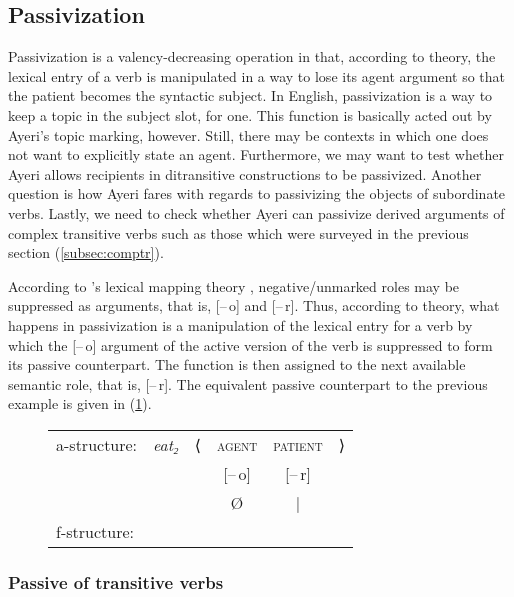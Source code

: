 \subsection{Passivization}
\label{subsubsec:valdecr}

Passivization is a valency-decreasing operation in that, according to \Lfg{}
theory, the lexical entry of a verb is manipulated in a way to lose its agent
argument so that the patient becomes the syntactic subject. In English,
passivization is a way to keep a topic in the subject slot, for one. This
function is basically acted out by Ayeri's topic marking, however. Still, there
may be contexts in which one does not want to explicitly state an agent.
Furthermore, we may want to test whether Ayeri allows recipients in
ditransitive constructions to be passivized. Another question is how Ayeri
fares with regards to passivizing the objects of subordinate verbs. Lastly, we
need to check whether Ayeri can passivize derived arguments of complex
transitive verbs such as those which were surveyed in the previous section 
(\autoref{subsec:comptr}).

According to \Lfg{}'s lexical mapping theory
\parencites[324--348]{bresnan2016}[413--414]{needhamtoivonen2011},
negative/unmarked roles may be suppressed as arguments, that is, [–\,o] and
[–\,r]. Thus, according to \Lfg{} theory, what happens in passivization is a
manipulation of the lexical entry for a verb by which the [–\,o] argument of
the active version of the verb is suppressed to form its passive counterpart.
The \Subj{} function is then assigned to the next available semantic role, that
is, [–\,r]. The equivalent passive counterpart to the previous example is given
in (\ref{ex:engpassive}).

\begin{figure}[h]
\ex\label{ex:engpassive}
\begin{tabular}[t]{l >{\itshape}l l c c r}
a-structure:
	& eat₂
	& ⟨
	& \textsc{agent}
	& \textsc{patient}
	& ⟩
	\\
%
	& %
	& %
	& [–\,o]
	& [–\,r]
	& %
	\\

%
	& %
	& %
	& Ø
	& |
	& %
	\\

f-structure:
	& %
	& %
	& %
	& \Subj
	& %
	\\
\end{tabular}
\xe
\end{figure}

\subsubsection{Passive of transitive verbs}

